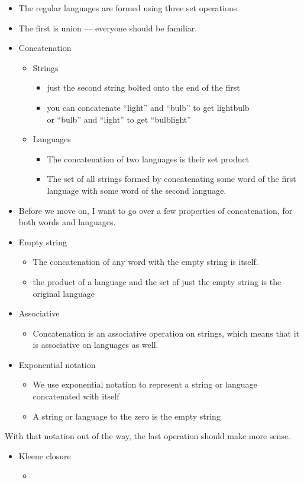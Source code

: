\documentclass[12pt, twoside, letterpaper]{article}
\begin{document}
\begin{itemize}
	\item The regular languages are formed using three set operations
	\item The first is union --- everyone should be familiar.
	\item Concatenation
	\begin{itemize}
		\item Strings
		\begin{itemize}
			\item just the second string bolted onto the end of the first
			\item you can concatenate ``light'' and ``bulb'' to get lightbulb \\ or ``bulb'' and ``light'' to get ``bulblight''
		\end{itemize}
		\item Languages
		\begin{itemize}
			\item The concatenation of two languages is their set product
			\item The set of all strings formed by concatenating some word of the first language with some word of the second language.
		\end{itemize}
	\end{itemize}
	\item Before we move on, I want to go over a few properties of concatenation, for both words and languages.
	\item Empty string
	\begin{itemize}
		\item The concatenation of any word with the empty string is itself.
		\item the product of a language and the set of just the empty string is the original language
	\end{itemize}

	\item Associative
	\begin{itemize}
		\item Concatenation is an associative operation on strings, which means that it is associative on languages as well.
	\end{itemize}

	\item Exponential notation
	\begin{itemize}
		\item We use exponential notation to represent a string or language concatenated with itself
		\item A string or language to the zero is the empty string
	\end{itemize}
\end{itemize}

With that notation out of the way, the last operation should make more sense.
\begin{itemize}
	\item Kleene closure
	\begin{itemize}
		\item 
	\end{itemize}
\end{itemize}
\end{document}
